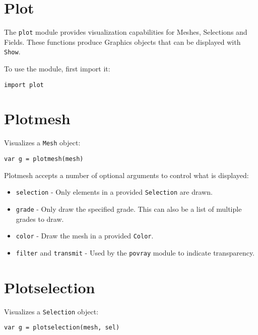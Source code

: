 \hypertarget{plot}{%
\section{Plot}\label{plot}}

The \texttt{plot} module provides visualization capabilities for Meshes,
Selections and Fields. These functions produce Graphics objects that can
be displayed with \texttt{Show}.

To use the module, first import it:

\begin{lstlisting}
import plot
\end{lstlisting}

\hypertarget{plotmesh}{%
\section{Plotmesh}\label{plotmesh}}

Visualizes a \texttt{Mesh} object:

\begin{lstlisting}
var g = plotmesh(mesh)
\end{lstlisting}

Plotmesh accepts a number of optional arguments to control what is
displayed:

\begin{itemize}

\item
  \texttt{selection} - Only elements in a provided \texttt{Selection}
  are drawn.
\item
  \texttt{grade} - Only draw the specified grade. This can also be a
  list of multiple grades to draw.
\item
  \texttt{color} - Draw the mesh in a provided \texttt{Color}.
\item
  \texttt{filter} and \texttt{transmit} - Used by the \texttt{povray}
  module to indicate transparency.
\end{itemize}

\hypertarget{plotselection}{%
\section{Plotselection}\label{plotselection}}

Visualizes a \texttt{Selection} object:

\begin{lstlisting}
var g = plotselection(mesh, sel)
\end{lstlisting}

